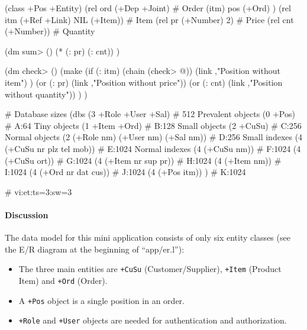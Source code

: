 \begin{wideverbatim}

(class +Pos +Entity)
(rel ord (+Dep +Joint)                 # Order
   (itm)
   pos (+Ord) )
(rel itm (+Ref +Link) NIL (+Item))     # Item
(rel pr (+Number) 2)                   # Price
(rel cnt (+Number))                    # Quantity

(dm sum> ()
   (* (: pr) (: cnt)) )

(dm check> ()
   (make
      (if (: itm)
         (chain (check> @))
         (link ,"Position without item") )
      (or (: pr) (link ,"Position without price"))
      (or (: cnt) (link ,"Position without quantity")) ) )


# Database sizes
(dbs
   (3 +Role +User +Sal)                         # 512 Prevalent objects
   (0 +Pos)                                     # A:64 Tiny objects
   (1 +Item +Ord)                               # B:128 Small objects
   (2 +CuSu)                                    # C:256 Normal objects
   (2 (+Role nm) (+User nm) (+Sal nm))          # D:256 Small indexes
   (4 (+CuSu nr plz tel mob))                   # E:1024 Normal indexes
   (4 (+CuSu nm))                               # F:1024
   (4 (+CuSu ort))                              # G:1024
   (4 (+Item nr sup pr))                        # H:1024
   (4 (+Item nm))                               # I:1024
   (4 (+Ord nr dat cus))                        # J:1024
   (4 (+Pos itm)) )                             # K:1024

# vi:et:ts=3:sw=3


\end{wideverbatim}


\paragraph{Discussion}
\label{sec:appl-devel-data-model-discussion}


The data model for this mini application consists of only six entity
classes (see the E/R diagram at the beginning of ``app/er.l''):

\begin{itemize}
\item The three main entities are \texttt{+CuSu} (Customer/Supplier), \texttt{+Item}
   (Product Item) and \texttt{+Ord} (Order).
\item A \texttt{+Pos} object is a single position in an order.
\item \texttt{+Role} and \texttt{+User} objects are needed for authentication and
   authorization.
\end{itemize}

